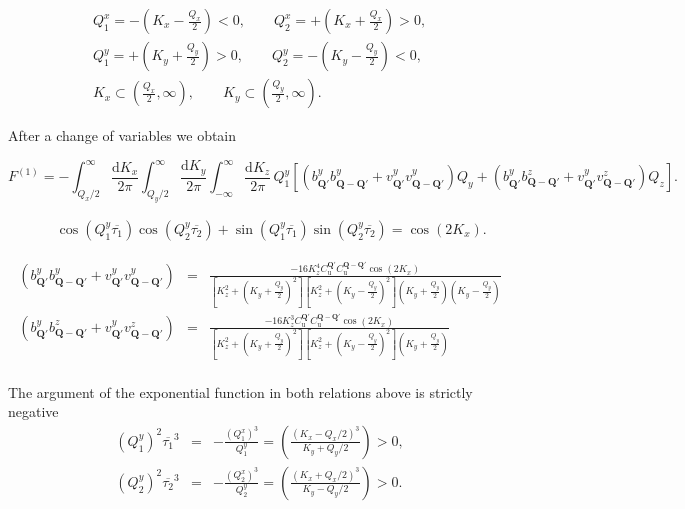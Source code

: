 \documentclass[a4paper,11pt]{article}
\begin{document}
\begin{eqnarray}
Q_1^x = -\left( K_x - \frac{Q_x}2  \right) < 0,\qquad Q_2^x = +\left( K_x + \frac{Q_x}2  \right) > 0, \\
Q_1^y = +\left( K_y + \frac{Q_y}2  \right) > 0,\qquad Q_2^y = -\left( K_y - \frac{Q_y}2  \right) < 0, \\
K_x \subset \left(\frac{Q_x}2,\infty\right), \qquad K_y \subset \left(\frac{Q_y}2,\infty\right).
\end{eqnarray}

After a change of variables we obtain

\begin{equation}
\label{I_initial}
 F^{(1)}=-\int_{Q_x/2}^\infty \frac{\mathrm{d}K_x}{2\pi} \int_{Q_y/2}^\infty \frac{\mathrm{d}K_y}{2\pi} \int_{-\infty}^\infty \frac{\mathrm{d}K_z}{2\pi} \, Q_1^y \left[(b_{\mathbf{Q}'}^yb_{\mathbf{Q}-\mathbf{Q}'}^y + v_{\mathbf{Q}'}^yv_{\mathbf{Q}-\mathbf{Q}'}^y)Q_y + (b_{\mathbf{Q}'}^yb_{\mathbf{Q}-\mathbf{Q}'}^z + v_{\mathbf{Q}'}^yv_{\mathbf{Q}-\mathbf{Q}'}^z)Q_z\right].
\end{equation}


\begin{eqnarray*}
&&\cos\left(Q^y_1\overline{\tau_1}\right)\cos\left(Q^y_2\overline{\tau_2}\right) + \sin\left(Q^y_1\overline{\tau_1}\right)\sin\left(Q^y_2\overline{\tau_2}\right) = \cos(2K_x).
\end{eqnarray*}


\begin{eqnarray}
 (b_{\mathbf{Q}'}^yb_{\mathbf{Q}-\mathbf{Q}'}^y + v_{\mathbf{Q}'}^yv_{\mathbf{Q}-\mathbf{Q}'}^y)&=& \frac{-16K_z^4 C_\mathrm{u}^{\mathbf{Q}'}C_\mathrm{u}^{\mathbf{Q-Q}'} \cos(2K_x)  }
  { \left[K_z^2 + \left(K_y+\frac{Q_y}2 \right)^2\right] \left[K_z^2 + \left(K_y - \frac{Q_y}2 \right)^2\right]\left(K_y +\frac{Q_y}2 \right) \left(K_y - \frac{Q_y}2 \right)}  \\
 (b_{\mathbf{Q}'}^yb_{\mathbf{Q}-\mathbf{Q}'}^z + v_{\mathbf{Q}'}^yv_{\mathbf{Q}-\mathbf{Q}'}^z)&=& \frac{-16K_z^3 C_\mathrm{u}^{\mathbf{Q}'}C_\mathrm{u}^{\mathbf{Q-Q}'} \cos(2K_x)  }
  { \left[K_z^2 + \left(K_y+\frac{Q_y}2 \right)^2\right] \left[K_z^2 + \left(K_y - \frac{Q_y}2 \right)^2\right]\left(K_y +\frac{Q_y}2 \right) }  \\
\end{eqnarray}



The argument of the exponential function in both relations above is strictly negative
\begin{eqnarray*}
 (Q_1^y)^2\overline{\tau_1}^3 &=& -\frac{(Q_1^x)^3}{Q_1^y} = \left( \frac{(K_x-Q_x/2)^3}{K_y+Q_y/2}\right) > 0,\\
 (Q_2^y)^2\overline{\tau_2}^3 &=& -\frac{(Q_2^x)^3}{Q_2^y} = \left( \frac{(K_x+Q_x/2)^3}{K_y-Q_y/2}\right) > 0.
\end{eqnarray*}
\end{document}

